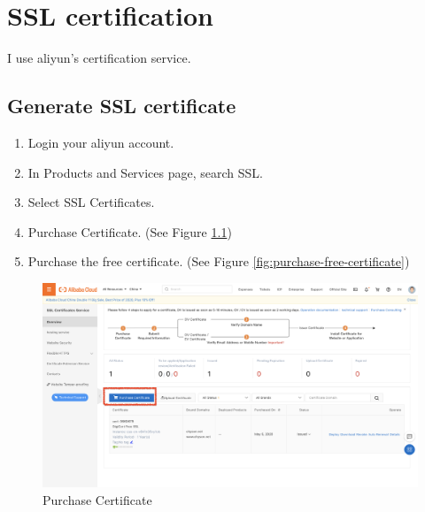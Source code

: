 
\chapter{SSL certification}

I use aliyun's certification service.

\section{Generate SSL certificate}

\begin{enumerate}
\item Login your aliyun account.
\item In Products and Services page, search SSL.
\item Select SSL Certificates.
\item Purchase Certificate.  (See Figure \ref{fig:purchase-certificate})
\item Purchase the free certificate. (See Figure \ref{fig:purchase-free-certificate})
\end{enumerate}


\begin{figure}[!ht]
  \centering
  \includegraphics[width=\textwidth]{purchase-certificate.png}
  \caption{Purchase Certificate}
  \label{fig:purchase-certificate}
\end{figure}




